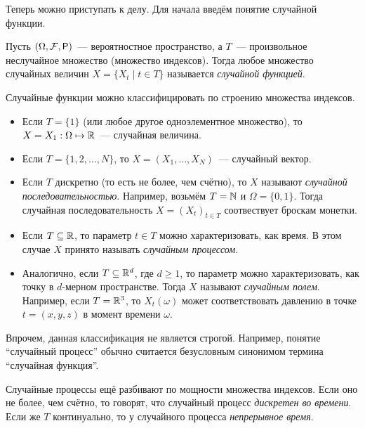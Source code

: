 Теперь можно приступать к делу. Для начала введём понятие случайной функции.
\begin{definition}
	Пусть \((\Omega, \F, \Pr)\)~--- вероятностное пространство, а \(T\)~--- 
	произвольное неслучайное множество (множество индексов). Тогда любое 
	множество случайных величин \(X = \{X_{t} \mid t \in T\}\) называется 
	\emph{случайной функцией}.
\end{definition}
Случайные функции можно классифицировать по строению множества индексов.
\begin{itemize}
	\item Если \(T = \{1\}\) (или любое другое одноэлементное множество), то 
	\(X = X_{1} : \Omega \mapsto \mathbb{R}\)~--- случайная величина.
	\item Если \(T = \{1, 2, \ldots, N\}\), то \(X = (X_{1}, \ldots, 
	X_{N})\)~--- случайный вектор.
	\item Если \(T\) дискретно (то есть не более, чем счётно), то \(X\) 
	называют \emph{случайной последовательностью}. Например, возьмём \(T = \mathbb{N}\) 
	и \(\Omega = \{0, 1\}\). Тогда случайная последовательность \(X = (X_t)_{t 
	\in T}\) соотвествует броскам монетки.
	\item Если \(T \subseteq \mathbb{R}\), то параметр \(t \in T\) можно 
	характеризовать, как время. В этом случае \(X\) принято называть 
	\emph{случайным процессом}.
	\item Аналогично, если \(T \subseteq \mathbb{R}^{d}\), где \(d \geq 1\), то 
	параметр можно характеризовать, как точку в \(d\)-мерном пространстве. 
	Тогда \(X\) называют \emph{случайным полем}. Например, если \(T = \mathbb{R}^{3}\), 
	то \(X_{t}(\omega)\) может соответствовать давлению в точке \(t = (x, y, 
	z)\) в момент времени \(\omega\).
\end{itemize}

Впрочем, данная классификация не является строгой. Например, понятие 
``случайный процесс'' обычно считается безусловным синонимом термина 
``случайная функция''.

Случайные процессы ещё разбивают по мощности множества индексов. Если оно не 
более, чем счётно, то говорят, что случайный процесс \emph{дискретен во 
времени}. Если же \(T\) континуально, то у случайного процесса 
\emph{непрерывное время}.

